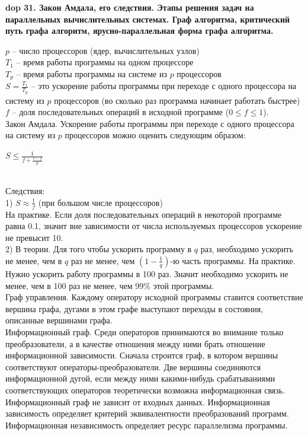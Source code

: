 \textbf{\LARGE dop 31. Закон Амдала, его следствия. Этапы решения задач на параллельных вычислительных системах. Граф алгоритма, критический путь графа алгоритм, ярусно-параллельная форма графа алгоритма.}

$p$ – число процессоров (ядер, вычислительных узлов)\\
$T_{1}$ – время работы программы на одном процессоре\\
$T_{p}$ – время работы программы на системе из $p$ процессоров\\
$S = \frac{T_{1}}{T_{p}}$ – это ускорение работы программы при переходе с одного процессора на систему из $p$ процессоров (во сколько раз
программа начинает работать быстрее)\\
$f$ – доля последовательных операций в исходной программе ($0 \leq f \leq 1$).\\

Закон Амдала.
Ускорение работы программы при переходе с одного процессора на систему из $p$ процессоров можно оценить следующим образом:
\begin{center}
$S \leq \frac{1}{f + \frac{1 - f}{p}}$
\end{center}\\

Следствия:\\
1) $S \approx \frac{1}{f}$ (при большом числе процессоров)\\
На практике. Если доля последовательных операций в некоторой программе равна 0.1, значит вне зависимости от числа используемых процессоров ускорение не превысит 10.\\
2) В теории. Для того чтобы ускорить программу в $q$ раз, необходимо ускорить не менее, чем в $q$ раз не менее, чем $(1-\frac{1}{q})$-ю часть программы.
На практике. Нужно ускорить работу программы в 100 раз. Значит необходимо ускорить не менее, чем в 100 раз не менее, чем 99\% этой программы.\\

Граф управления. Каждому оператору исходной программы ставится соответствие вершина графа, дугами в этом графе выступают переходы в состояния, описанные вершинами графа.\\

Информационный граф. Среди операторов принимаются во внимание только преобразователи, а в качестве отношения между ними брать отношение информационной зависимости. Сначала строится граф, в котором вершины соответствуют операторы-преобразователи. Две вершины соединяются информационной дугой, если между ними какими-нибудь срабатываниями соответствующих операторов теоретически возможна информационная связь. Информационный граф не зависит от входных данных. Информационная зависимость определяет критерий эквивалентности преобразований программ.
Информационная независимость определяет ресурс параллелизма программы.\\

